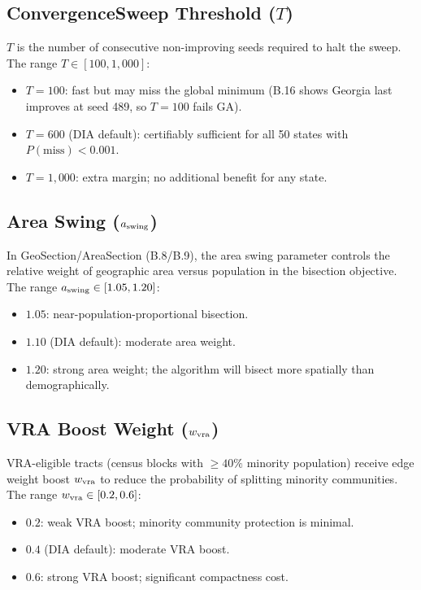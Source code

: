 \subsection{ConvergenceSweep Threshold ($T$)}

$T$ is the number of consecutive non-improving seeds required to halt
the sweep.
The range $T \in [100, 1{,}000]$:
\begin{itemize}
\item $T = 100$: fast but may miss the global minimum (B.16 shows
      Georgia last improves at seed 489, so $T = 100$ fails GA).
\item $T = 600$ (DIA default): certifiably sufficient for all 50 states
      with $P(\text{miss}) < 0.001$.
\item $T = 1{,}000$: extra margin; no additional benefit for any state.
\end{itemize}

\subsection{Area Swing ($a_{\mathrm{swing}}$)}

In GeoSection/AreaSection (B.8/B.9), the area swing parameter controls
the relative weight of geographic area versus population in the bisection
objective.
The range $a_{\mathrm{swing}} \in [1.05, 1.20]$:
\begin{itemize}
\item $1.05$: near-population-proportional bisection.
\item $1.10$ (DIA default): moderate area weight.
\item $1.20$: strong area weight; the algorithm will bisect more
      spatially than demographically.
\end{itemize}

\subsection{VRA Boost Weight ($w_{\mathrm{vra}}$)}

VRA-eligible tracts (census blocks with $\geq 40\%$ minority population)
receive edge weight boost $w_{\mathrm{vra}}$ to reduce the probability of splitting
minority communities.
The range $w_{\mathrm{vra}} \in [0.2, 0.6]$:
\begin{itemize}
\item $0.2$: weak VRA boost; minority community protection is minimal.
\item $0.4$ (DIA default): moderate VRA boost.
\item $0.6$: strong VRA boost; significant compactness cost.
\end{itemize}
